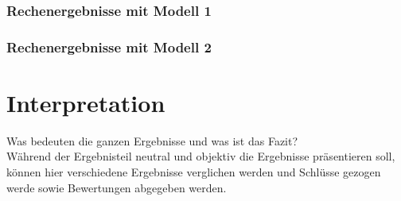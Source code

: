 \subsubsection{Rechenergebnisse mit Modell 1}

\subsubsection{Rechenergebnisse mit Modell 2}

\section{Interpretation}
\label{Interpretation}

Was bedeuten die ganzen Ergebnisse und was ist
das Fazit?\\ Während der Ergebnisteil neutral und objektiv die
Ergebnisse präsentieren soll, können hier verschiedene Ergebnisse
verglichen werden und Schlüsse gezogen werde sowie Bewertungen
abgegeben werden.
